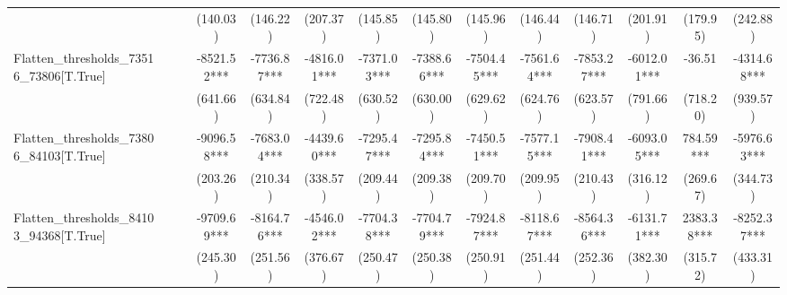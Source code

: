 \begin{subappendices}
{\begin{landscape}
\begin{table}[H]
{\begin{tabular}{lccccccccccccc}
                                         &                    &                         & (140.03)                         & (146.22)    & (207.37)                 & (145.85)          & (145.80)    & (145.96)             & (146.44)                & (146.71)                 & (201.91)              & (179.95)                  & (242.88)                   \\
Flatten_thresholds_73516_73806[T.True]   &                    &                         & -8521.52***                      & -7736.87*** & -4816.01***              & -7371.03***       & -7388.66*** & -7504.45***          & -7561.64***             & -7853.27***              & -6012.01***           & -36.51                    & -4314.68***                \\
                                         &                    &                         & (641.66)                         & (634.84)    & (722.48)                 & (630.52)          & (630.00)    & (629.62)             & (624.76)                & (623.57)                 & (791.66)              & (718.20)                  & (939.57)                   \\
Flatten_thresholds_73806_84103[T.True]   &                    &                         & -9096.58***                      & -7683.04*** & -4439.60***              & -7295.47***       & -7295.84*** & -7450.51***          & -7577.15***             & -7908.41***              & -6093.05***           & 784.59***                 & -5976.63***                \\
                                         &                    &                         & (203.26)                         & (210.34)    & (338.57)                 & (209.44)          & (209.38)    & (209.70)             & (209.95)                & (210.43)                 & (316.12)              & (269.67)                  & (344.73)                   \\
Flatten_thresholds_84103_94368[T.True]   &                    &                         & -9709.69***                      & -8164.76*** & -4546.02***              & -7704.38***       & -7704.79*** & -7924.87***          & -8118.67***             & -8564.36***              & -6131.71***           & 2383.38***                & -8252.37***                \\
                                         &                    &                         & (245.30)                         & (251.56)    & (376.67)                 & (250.47)          & (250.38)    & (250.91)             & (251.44)                & (252.36)                 & (382.30)              & (315.72)                  & (433.31)                   \\

\end{tabular}}
\end{table}
\end{landscape}}
\end{subappendices}
